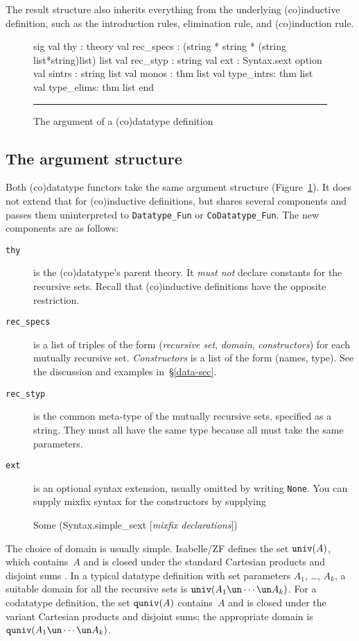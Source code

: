 The result structure also inherits everything from the underlying
(co)inductive definition, such as the introduction rules, elimination rule,
and (co)induction rule.


\begin{figure}
\begin{ttbox}
sig
val thy       : theory
val rec_specs : (string * string * (string list*string)list) list
val rec_styp  : string
val ext       : Syntax.sext option
val sintrs    : string list
val monos     : thm list
val type_intrs: thm list
val type_elims: thm list
end
\end{ttbox}
\hrule
\caption{The argument of a (co)datatype definition} \label{data-arg-fig}
\end{figure}

\subsection{The argument structure}
Both (co)datatype functors take the same argument structure
(Figure~\ref{data-arg-fig}).  It does not extend that for (co)inductive
definitions, but shares several components  and passes them uninterpreted to
\verb|Datatype_Fun| or
\verb|CoDatatype_Fun|.  The new components are as follows:
\begin{description}
\item[\tt thy] is the (co)datatype's parent theory. It {\it must not\/}
declare constants for the recursive sets.  Recall that (co)inductive
definitions have the opposite restriction.

\item[\tt rec\_specs] is a list of triples of the form ({\it recursive set\/},
{\it domain\/}, {\it constructors\/}) for each mutually recursive set.  {\it
Constructors\/} is a list of the form (names, type).  See the discussion and
examples in~\S\ref{data-sec}.

\item[\tt rec\_styp] is the common meta-type of the mutually recursive sets,
specified as a string.  They must all have the same type because all must
take the same parameters.

\item[\tt ext] is an optional syntax extension, usually omitted by writing
{\tt None}.  You can supply mixfix syntax for the constructors by supplying
\begin{ttbox}
Some (Syntax.simple_sext [{\it mixfix declarations\/}])
\end{ttbox}
\end{description}
The choice of domain is usually simple.  Isabelle/ZF defines the set
${\tt univ}(A)$, which contains~$A$ and is closed under the standard Cartesian
products and disjoint sums \cite[\S4.2]{paulson-set-II}.  In a typical
datatype definition with set parameters $A_1$, \ldots, $A_k$, a suitable
domain for all the recursive sets is $\univ(A_1\un\cdots\un A_k)$.  For a
codatatype definition, the set
${\tt quniv}(A)$ contains~$A$ and is closed under the variant Cartesian products
and disjoint sums; the appropriate domain is
$\quniv(A_1\un\cdots\un A_k)$.

